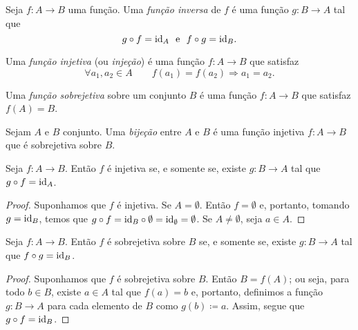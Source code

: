 \begin{defi}
	Seja $f: A \to B$ uma função. Uma \emph{função inversa} de $f$ é uma função $g: B \to A$ tal que
	\begin{equation*}
	g \circ f = \mathrm{id}_A \text{\ \ e\ \ } f \circ g = \mathrm{id}_B.
	\end{equation*}
\end{defi}

\begin{defi}
	Uma \emph{função injetiva} (ou \emph{injeção}) é uma função $f: A \to B$ que satisfaz
	\begin{equation*}
	\forall a_1,a_2 \in A \qquad f(a_1)=f(a_2) \Rightarrow a_1=a_2.
	\end{equation*}
\end{defi}

\begin{defi}
	Uma \emph{função sobrejetiva} sobre um conjunto $B$ é uma função $f: A \to B$ que satisfaz $f(A)=B$.
\end{defi}

\begin{defi}
	Sejam $A$ e $B$ conjunto. Uma \emph{bijeção} entre $A$ e $B$ é uma função injetiva $f: A \to B$ que é sobrejetiva sobre $B$.
\end{defi}

\begin{prop}
\label{prop:func.inv.esq}
	Seja $f: A \to B$. Então $f$ é injetiva se, e somente se, existe $g: B \to A$ tal que $g \circ f = \mathrm{id}_A$.
\end{prop}
\begin{proof}
	Suponhamos que $f$ é injetiva. Se $A = \emptyset$. Então $f=\emptyset$ e, portanto, tomando $g=\mathrm{id}_B$, temos que $g \circ f = \mathrm{id}_B \circ \emptyset = \mathrm{id}_\emptyset = \emptyset$.
	Se $A \neq \emptyset$, seja $a \in A$.
	
	
\end{proof}

\begin{prop}
\label{prop:func.inv.dir}
	Seja $f: A \to B$. Então $f$ é sobrejetiva sobre $B$ se, e somente se, existe $g: B \to A$ tal que $f \circ g = \mathrm{id}_B$.
\end{prop}
\begin{proof}
	Suponhamos que $f$ é sobrejetiva sobre $B$. Então $B=f(A)$; ou seja, para todo $b \in B$, existe $a \in A$ tal que $f(a)=b$ e, portanto, definimos a função $g: B \to A$ para cada elemento de $B$ como $g(b) \coloneqq a$. Assim, segue que $g \circ f = \mathrm{id}_B$.
\end{proof}

